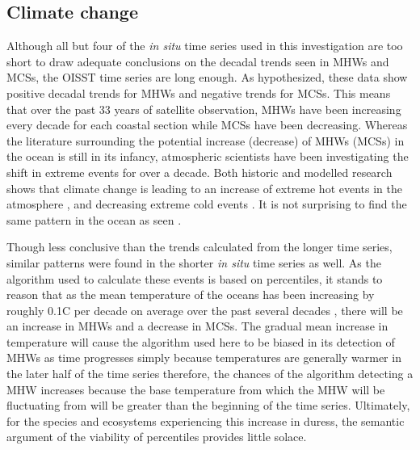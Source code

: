 \documentclass[a4paper,10pt,review]{elsarticle}
\begin{document}
\subsection{Climate change}
Although all but four of the \emph{in situ} time series used in this investigation are too short to draw adequate conclusions on the decadal trends seen in MHWs and MCSs, the OISST time series are long enough. As hypothesized, these data show positive decadal trends for MHWs and negative trends for MCSs. This means that over the past 33 years of satellite observation, MHWs have been increasing every decade for each coastal section while MCSs have been decreasing. Whereas the literature surrounding the potential increase (decrease) of MHWs (MCSs) in the ocean is still in its infancy, atmospheric scientists have been investigating the shift in extreme events for over a decade. Both historic and modelled research shows that climate change is leading to an increase of extreme hot events in the atmosphere \citep{Easterling2000, Perkins2013}, and decreasing extreme cold events \citep{Meehl2004}. It is not surprising to find the same pattern in the ocean as seen .

Though less conclusive than the trends calculated from the longer time series, similar patterns were found in the shorter \emph{in situ} time series as well. As the algorithm used to calculate these events is based on percentiles, it stands to reason that as the mean temperature of the oceans has been increasing by roughly 0.1\degree C per decade on average over the past several decades \citep{IPCC2014}, there will be an increase in MHWs and a decrease in MCSs. The gradual mean increase in temperature will cause the algorithm used here to be biased in its detection of MHWs as time progresses simply because temperatures are generally warmer in the later half of the time series therefore, the chances of the algorithm detecting a MHW increases because the base temperature from which the MHW will be fluctuating from will be greater than the beginning of the time series. Ultimately, for the species and ecosystems experiencing this increase in duress, the semantic argument of the viability of percentiles provides little solace.
\end{document}
